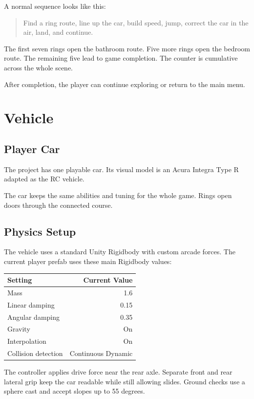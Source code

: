 \documentclass[11pt,a4paper]{article}
\begin{document}
A normal sequence looks like this:

\begin{quote}
Find a ring route, line up the car, build speed, jump, correct the car in the air, land, and continue.
\end{quote}

The first seven rings open the bathroom route. Five more rings open the bedroom route. The remaining five lead to game completion. The counter is cumulative across the whole scene.

After completion, the player can continue exploring or return to the main menu.

\section{Vehicle}\label{vehicle}

\subsection{Player Car}\label{player-car}

The project has one playable car. Its visual model is an Acura Integra Type R adapted as the RC vehicle.

The car keeps the same abilities and tuning for the whole game. Rings open doors through the connected course.

\subsection{Physics Setup}\label{physics-setup}

The vehicle uses a standard Unity Rigidbody with custom arcade forces. The current player prefab uses these main Rigidbody values:

\begin{longtable}[]{@{}lr@{}}
\toprule\noalign{}
\textbf{Setting} & \textbf{Current Value} \\
\midrule\noalign{}
\endhead
\bottomrule\noalign{}
\endlastfoot
Mass & 1.6 \\
Linear damping & 0.15 \\
Angular damping & 0.35 \\
Gravity & On \\
Interpolation & On \\
Collision detection & Continuous Dynamic \\
\end{longtable}

The controller applies drive force near the rear axle. Separate front and rear lateral grip keep the car readable while still allowing slides. Ground checks use a sphere cast and accept slopes up to 55 degrees.
\end{document}
